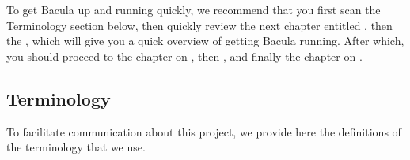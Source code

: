 To get Bacula up and running quickly, we recommend that you first scan the
Terminology section below, then quickly review the next chapter entitled 
, then the 
, which will
give you a quick overview of getting Bacula running. After which, you should
proceed to the chapter on 
, then 
, and finally the
chapter on 
. 

\subsection*{Terminology}

To facilitate communication about this project, we provide here the
definitions of the terminology that we use. 

